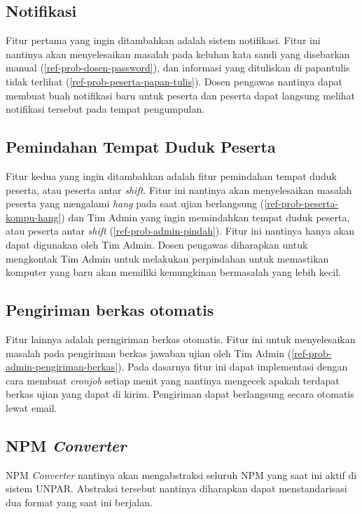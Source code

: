     \subsection{Notifikasi}
        Fitur pertama yang ingin ditambahkan adalah sistem notifikasi. Fitur ini
        nantinya akan menyelesaikan masalah pada keluhan kata sandi yang
        disebarkan manual (\ref{ref-prob-dosen-password}), dan informasi yang
        dituliskan di papantulis tidak terlihat
        (\ref{ref-prob-peserta-papan-tulis}). Dosen pengawas nantinya dapat
        membuat buah notifikasi baru untuk peserta dan peserta dapat langsung
        melihat notifikasi tersebut pada tempat pengumpulan.

    \subsection{Pemindahan Tempat Duduk Peserta}
        Fitur kedua yang ingin ditambahkan adalah fitur pemindahan tempat duduk
        peserta, atau peserta antar \textit{shift}. Fitur ini nantinya akan
        menyelesaikan masalah peserta yang mengalami \textit{hang} pada saat
        ujian berlangsung (\ref{ref-prob-peserta-kompu-hang}) dan Tim Admin yang
        ingin memindahkan tempat duduk peserta, atau peserta antar
        \textit{shift} (\ref{ref-prob-admin-pindah}). Fitur ini nantinya hanya
        akan dapat digunakan oleh Tim Admin. Dosen pengawas diharapkan untuk
        mengkontak Tim Admin untuk melakukan perpindahan untuk memastikan
        komputer yang baru akan memiliki kemungkinan bermasalah yang lebih
        kecil.

    \subsection{Pengiriman berkas otomatis}
        Fitur lainnya adalah perngiriman berkas otomatis. Fitur ini untuk
        menyelesaikan masalah pada pengiriman berkas jawaban ujian oleh Tim
        Admin (\ref{ref-prob-admin-pengiriman-berkas}). Pada dasarnya fitur ini
        dapat implementasi dengan cara membuat \textit{cronjob} setiap menit
        yang nantinya mengecek apakah terdapat berkas ujian yang dapat di kirim.
        Pengiriman dapat berlangsung secara otomatis lewat email.

    \subsection{NPM \textit{Converter}} NPM \textit{Converter} nantinya akan
        mengabstraksi seluruh NPM yang saat ini aktif di sistem UNPAR. Abstraksi
        tersebut nantinya diharapkan dapat menstandarisasi dua format yang saat
        ini berjalan.
        
